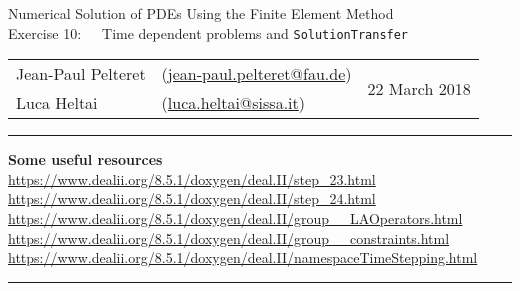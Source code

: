 \documentclass[11pt]{exam}
\makeatletter
\newcommand{\makeheader}[3]{%
\setcounter{question}{0}
\begin{center}
{\sc Numerical Solution of PDEs Using the Finite Element Method}\vspace{2ex}\\
{\sc Exercise #1:\ \ \ #2}\vspace{2ex}\\
\begin{tabular*}{\textwidth}{ll @{\extracolsep{\fill}}r}
Jean-Paul Pelteret & (\url{jean-paul.pelteret@fau.de}) & \multirow{2}{*}{#3} \\
Luca Heltai & (\url{luca.heltai@sissa.it}) & \\
\end{tabular*}
\end{center}
}
\newcommand{\makeresources}[1]{%
\rule{\textwidth}{0.6mm}
\textbf{Some useful resources}\\[1.5ex]
#1 \par
\rule{\textwidth}{0.6mm}
}
\makeatother
\begin{document}
\clearpage
\makeheader{10}{Time dependent problems and \texttt{SolutionTransfer}}{22 March 2018}
\makeresources{%
\url{https://www.dealii.org/8.5.1/doxygen/deal.II/step_23.html} \\
\url{https://www.dealii.org/8.5.1/doxygen/deal.II/step_24.html} \\
\url{https://www.dealii.org/8.5.1/doxygen/deal.II/group__LAOperators.html} \\
\url{https://www.dealii.org/8.5.1/doxygen/deal.II/group__constraints.html} \\
\url{https://www.dealii.org/8.5.1/doxygen/deal.II/namespaceTimeStepping.html}
}
\end{document}
